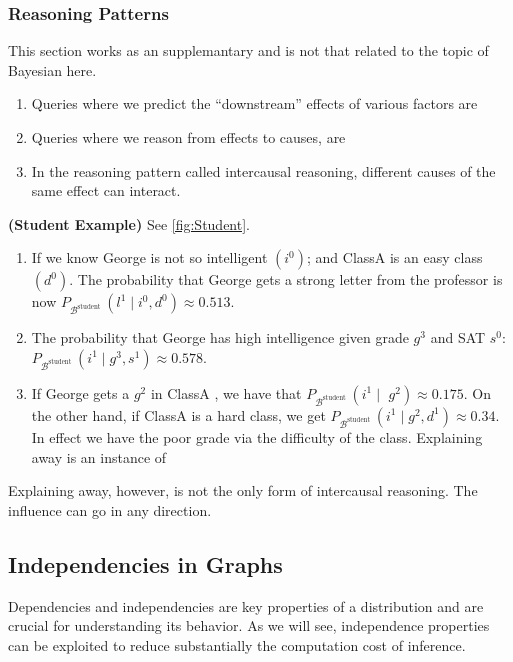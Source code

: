 \documentclass{article}
\newcommand{\bfs}[1]{\textbf{({#1}) }}
\begin{document}
\subsubsection{Reasoning Patterns}
This section works as an supplemantary and is not that related to the topic of Bayesian here.
\begin{enumerate}
    \item {} Queries where we predict the “downstream” effects of various factors are 
    \item {} Queries where we reason from effects to causes, are 
    \item {}  In the reasoning pattern called intercausal reasoning, different causes of the same effect can interact.  
\end{enumerate}
\begin{exma}\bfs{Student Example} See \cref{fig:Student}. \label{ex:ndfwe}\begin{enumerate}
    \item {}  If we know George is not so intelligent $\left(i^{0}\right)$; and  ClassA is an easy class $\left(d^{0}\right)$. The probability that George gets a strong letter from the professor is now $P_{\mathcal{B}^{\text {student }}}\left(l^{1} \mid i^{0}, d^{0}\right) \approx 0.513$.
    \item {} The probability that George has high intelligence given grade $g^3$ and SAT $s^0$:  $P_{\mathcal{B}^{\text {student }}}\left(i^{1} \mid g^{3}, s^{1}\right) \approx 0.578$.
    \item {} If George gets a $g^2$ in ClassA , we have that $P_{\mathcal{B}^{\text {student }}}\left(i^{1} \mid\right.$ $\left.g^{2}\right) \approx 0.175 .$ On the other hand, if ClassA is a hard class, we get $P_{\mathcal{B}^{\text {student }}}\left(i^{1} \mid g^{2}, d^{1}\right) \approx 0.34 .$ In effect we have  the poor grade via the difficulty of the class.  Explaining away is an instance of  
\end{enumerate}
\end{exma}
\begin{rema}
Explaining away, however, is not the only form of intercausal reasoning. The influence can go in any direction.
\end{rema}


\subsection{Independencies in Graphs}\label{sec:ind_gra_bayes}
Dependencies and independencies are key properties of a distribution and are crucial for understanding its behavior. As we will see, independence properties can be exploited to reduce substantially the computation cost of inference.
\end{document}
